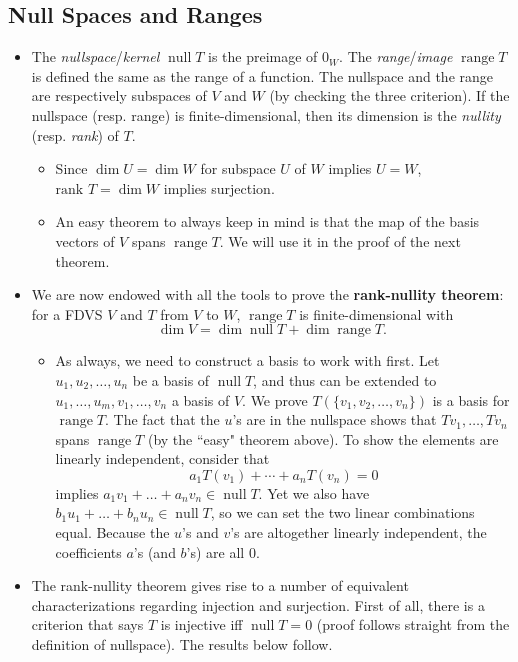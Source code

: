 \documentclass{article}
\newcommand{\n}{\operatorname{null}}
\renewcommand{\r}{\operatorname{range}}
\renewcommand{\d}{\dim}
\begin{document}
\subsection{Null Spaces and Ranges}
\begin{itemize}
    \item The \textit{nullspace}/\textit{kernel} $\n T$ is the preimage of $0_W$. The \textit{range}/\textit{image} $\r T$ is defined the same as the range of a function. The nullspace and the range are respectively subspaces of $V$ and $W$ (by checking the three criterion). If the nullspace (resp. range) is finite-dimensional, then its dimension is the \textit{nullity} (resp. \textit{rank}) of $T$.
    \begin{itemize}
        \item Since $\d U = \d W$ for subspace $U$ of $W$ implies $U = W$, $\text{rank }T = \d W$ implies surjection.
        \item An easy theorem to always keep in mind is that the map of the basis vectors of $V$ spans $\r T$. We will use it in the proof of the next theorem.
    \end{itemize}
    \item We are now endowed with all the tools to prove the \textbf{rank-nullity theorem}: for a FDVS $V$ and $T$ from $V$ to $W$, $\r T$ is finite-dimensional with $$\d V = \d \n T + \d \r T.$$
    \begin{itemize}
        \item As always, we need to construct a basis to work with first. Let ${u_1, u_2, \dots, u_n}$ be a basis of $\n T$, and thus can be extended to ${u_1,\dots,u_m,v_1,\dots,v_n}$ a basis of $V$. We prove $T(\{v_1, v_2, \dots, v_n\})$ is a basis for $\r T$. The fact that the $u$'s are in the nullspace shows that $Tv_1, \dots,Tv_n$ spans $\r T$ (by the ``easy" theorem above). To show the elements are linearly independent, consider that $$a_1 T(v_1)+\cdots+a_n T(v_n) = 0$$ implies $a_1v_1+\dots+a_nv_n \in \n T$. Yet we also have $b_1u_1+\dots+b_nu_n \in \n T$, so we can set the two linear combinations equal. Because the $u$'s and $v$'s are altogether linearly independent, the coefficients $a$'s (and $b$'s) are all 0.
    \end{itemize}
    \item The rank-nullity theorem gives rise to a number of equivalent characterizations regarding injection and surjection. First of all, there is a criterion that says $T$ is injective iff $\n T = {0}$ (proof follows straight from the definition of nullspace). The results below follow.

\end{itemize}
\end{document}
